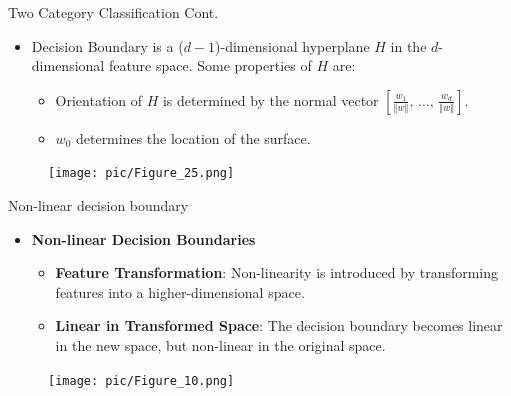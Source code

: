 \documentclass[serif, aspectratio=169]{beamer}
\begin{document}
\begin{frame}{Two Category Classification Cont.}
    \begin{itemize}\itemsep1.5em
        \item Decision Boundary is a (\(d - 1\))-dimensional hyperplane \(H\) in the \(d\)-dimensional feature space. Some properties of \(H\) are:
        \medskip
        \begin{itemize}\itemsep0.7em
            \item Orientation of \(H\) is determined by the normal vector \([\frac{w_1}{\Vert w \Vert} , \, ..., \, \frac{w_d}{\Vert w \Vert}]\).
            \item \(w_0\) determines the location of the surface.
        \end{itemize}
    \end{itemize}
    \begin{figure}
        \centering
        \texttt{[image: pic/Figure\_25.png]}
    \end{figure}
\end{frame}

\begin{frame}{Non-linear decision boundary}
    \begin{itemize}
        \item \textbf{Non-linear Decision Boundaries}
        \begin{itemize}\itemsep1em
            \item \justifying \textbf{Feature Transformation}: Non-linearity is introduced by transforming features into a higher-dimensional space.
            \item \justifying \textbf{Linear in Transformed Space}: The decision boundary becomes linear in the new space, but non-linear in the original space.
        \end{itemize}
    \end{itemize}
    \endminipage
    \hfill
        \begin{figure}[bh]
            \texttt{[image: pic/Figure\_10.png]}
        \end{figure}
    \endminipage
    \vfill
\end{frame}
\end{document}
